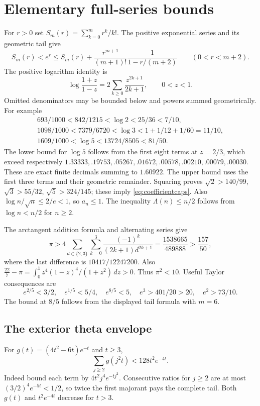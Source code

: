 \section{Elementary full-series bounds}\label{app:scalar}
For $r>0$ set $S_m(r)=\sum_{k=0}^m r^k/k!$.
The positive exponential series and its geometric tail give
\[
 S_m(r)<e^r\le S_m(r)+\frac{r^{m+1}}{(m+1)!}
                  \frac1{1-r/(m+2)}\qquad(0<r<m+2).
\]
The positive logarithm identity is
\begin{equation}\label{eq:atanh}
 \log\frac{1+z}{1-z}=2\sum_{k\ge0}\frac{z^{2k+1}}{2k+1},
 \qquad0<z<1.
\end{equation}
Omitted denominators may be bounded below and powers summed geometrically.
For example
\begin{gather*}
 693/1000<842/1215<\log2<25/36<7/10,\\
 1098/1000<7379/6720<\log3<1+1/12+1/60=11/10,\\
 1609/1000<\log5<13724/8505<81/50.
\end{gather*}
The lower bound for $\log5$ follows from the first eight terms at $z=2/3$,
which exceed respectively
$1.33333,.19753,.05267,.01672,.00578,.00210,.00079,.00030$.
These are exact finite decimals summing to $1.60922$.
The upper bound uses the first three terms and their geometric remainder.
Squaring proves
$\sqrt2>140/99$, $\sqrt3>55/32$, $\sqrt5>324/145$;
these imply \eqref{eq:coefficientcaps}.
Also $\log n/\sqrt n\le2/e<1$, so $a_n\le1$.
The inequality $\Lambda(n)\le n/2$ follows from $\log n<n/2$ for $n\ge2$.

The arctangent addition formula and alternating series give
\[
 \pi>4\sum_{d\in\{2,3\}}\sum_{k=0}^3
       \frac{(-1)^k}{(2k+1)d^{2k+1}}
 =\frac{1538665}{489888}>\frac{157}{50},
\]
where the last difference is $10417/12247200$.
Also
$\frac{22}{7}-\pi=\int_0^1z^4(1-z)^4/(1+z^2)\,dz>0$.
Thus $\pi^2<10$.
Useful Taylor consequences are
\[
 e^{2/5}<3/2,\quad e^{1/5}<5/4,\quad
 e^{8/5}<5,\quad e^3>401/20>20,\quad e^2>73/10.
\]
The bound at $8/5$ follows from the displayed tail formula with $m=6$.

\subsection{The exterior theta envelope}
For $g(t)=(4t^2-6t)e^{-t}$ and $t\ge3$,
\begin{equation}\label{eq:thetatotal}
 \sum_{j\ge2}g(j^2t)<128t^2e^{-4t}.
\end{equation}
Indeed bound each term by $4t^2j^4e^{-tj^2}$.
Consecutive ratios for $j\ge2$ are at most
$(3/2)^4e^{-5t}<1/2$, so twice the first majorant pays the complete tail.
Both $g(t)$ and $t^2e^{-4t}$ decrease for $t>3$.

